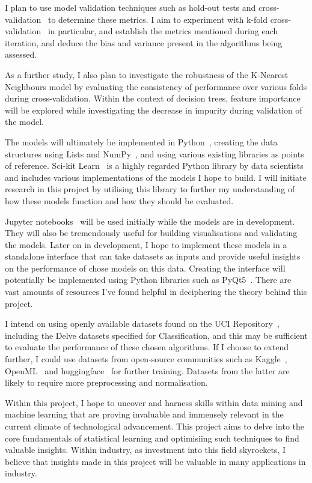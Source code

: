 \documentclass[report,10pt]{article}
\begin{document}
I plan to use model validation techniques such as hold-out tests and cross-validation~\cite{crossvalidationKohavi} to determine these metrics. I aim to experiment with k-fold cross-validation~\cite[p.241-249]{tEoSLHastie} in particular, and establish the metrics mentioned during each iteration, and deduce the bias and variance present in the algorithms being assessed. \par
As a further study, I also plan to investigate the robustness of the K-Nearest Neighbours model by evaluating the consistency of performance over various folds during cross-validation. Within the context of decision trees, feature importance will be explored while investigating the decrease in impurity during validation of the model. \par

The models will ultimately be implemented in Python~\cite{python3}, creating the data structures using Lists and NumPy~\cite{numpy}, and using various existing libraries as points of reference. Sci-kit Learn~\cite{scikit-learn} is a highly regarded Python library by data scientists and includes various implementations of the models I hope to build. I will initiate research in this project by utilising this library to further my understanding of how these models function and how they should be evaluated. \par
Jupyter notebooks~\cite{jupyter} will be used initially while the models are in development. They will also be tremendously useful for building visualisations and validating the models. Later on in development, I hope to implement these models in a standalone interface that can take datasets as inputs and provide useful insights on the performance of chose models on this data. Creating the interface will potentially be implemented using Python libraries such as PyQt5~\cite{pyqt5}. There are vast amounts of resources I've found helpful in deciphering the theory behind this project. \par
I intend on using openly available datasets found on the UCI Repository~\cite{uci}, including the Delve datasets specified for Classification, and this may be sufficient to evaluate the performance of these chosen algorithms. If I choose to extend further, I could use datasets from open-source communities such as Kaggle~\cite{kaggle}, OpenML~\cite{OpenML2013} and huggingface~\cite{huggingface} for further training. Datasets from the latter are likely to require more preprocessing and normalisation.  \par
Within this project, I hope to uncover and harness skills within data mining and machine learning that are proving invaluable and immensely relevant in the current climate of technological advancement. This project aims to delve into the core fundamentals of statistical learning and optimisiing such techniques to find valuable insights. Within industry, as investment into this field skyrockets, I believe that insights made in this project will be valuable in many applications in industry. 
\end{document}
